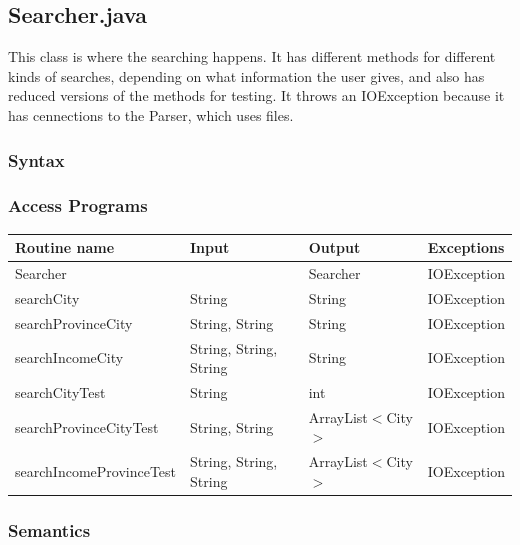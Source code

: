 \documentclass[12pt,fleqn]{article}
\begin{document}

\subsection*{Searcher.java}\label{search}
This class is where the searching happens. It has different methods for different kinds of searches, depending on what information the user gives, and also has reduced versions of the methods for testing. It throws an IOException because it has cennections to the Parser, which uses files.
\subsubsection* {Syntax}

\subsubsection* {Access Programs}
\begin{tabular}{| l | l | l | l |}
\hline
\textbf{Routine name} & \textbf{Input} & \textbf{Output} & \textbf{Exceptions}\\
\hline
Searcher & ~ & Searcher & IOException\\
\hline
searchCity & String & String & IOException\\
\hline
searchProvinceCity & String, String & String& IOException\\
\hline
searchIncomeCity & String, String, String & String & IOException\\
\hline
searchCityTest & String & int & IOException\\
\hline
searchProvinceCityTest & String, String & ArrayList$<$City$>$ & IOException\\
\hline
searchIncomeProvinceTest & String, String, String & ArrayList$<$City$>$ & IOException\\
\hline
\end{tabular}

\subsubsection*{Semantics}
\end{document}
